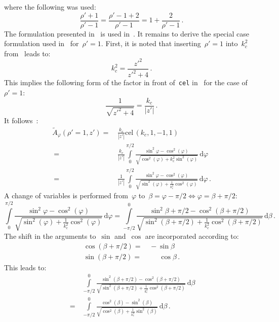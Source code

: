 where the following was used:
\begin{equation}
    \frac{\rho' + 1}{\rho' - 1}
  = \frac{\rho'-1 + 2}{\rho' - 1}
  = 1 + \frac{2}{\rho' - 1} \, .
\end{equation}
The formulation presented in~ is used in~.
It remains to derive the special case formulation used in~ for~$\rho'=1$.
First, it is noted that inserting~$\rho'=1$ into~$k_c^2$ from~ leads to:
\begin{equation}
  k_c^2 = \frac{z'^2}{z'^2 + 4} \, .
\end{equation}
This implies the following form of the factor in front of~\texttt{cel} in~
for the case of~$\rho'=1$:
\begin{equation}
  \frac{1}{\sqrt{z'^2 + 4}} = \frac{k_c}{|z'|} \, .
\end{equation}
It follows~\cite{bulirsch_3}:
\begin{align}
  \tilde{A}_\varphi(\rho'=1,z') =&\, \frac{k_c}{|z'|} \textrm{cel}\,(k_c, 1, -1, 1) \nonumber \\
  ~ =&\, \frac{k_c}{|z'|} \int\limits_0^{\pi/2} \frac{\sin^2{\varphi} - \cos^2(\varphi)}{\sqrt{\cos^2(\varphi) + k_c^2 \sin^2(\varphi)}} \,\mathrm{d}\varphi \nonumber \\
  ~ =&\,   \frac{1}{|z'|} \int\limits_0^{\pi/2} \frac{\sin^2{\varphi} - \cos^2(\varphi)}{\sqrt{\sin^2(\varphi) + \frac{1}{k_c^2} \cos^2(\varphi)}} \,\mathrm{d}\varphi \, .
\end{align}
A change of variables is performed from~$\varphi$ to~$\beta = \varphi - \pi/2 \Leftrightarrow \varphi = \beta + \pi/2$:
\begin{equation}
   \int\limits_0^{\pi/2} \frac{\sin^2{\varphi} - \cos^2(\varphi)}{\sqrt{\sin^2(\varphi) + \frac{1}{k_c^2} \cos^2(\varphi)}} \,\mathrm{d}\varphi
 = \int\limits_{-\pi/2}^{0} \frac{\sin^2{\beta + \pi/2} - \cos^2(\beta + \pi/2)}{\sqrt{\sin^2(\beta + \pi/2) + \frac{1}{k_c^2} \cos^2(\beta + \pi/2)}} \,\mathrm{d}\beta \, .
\end{equation}
The shift in the arguments to~$\sin$ and~$\cos$ are incorporated according to:
\begin{align}
  \cos(\beta + \pi/2) =&\,          -    \sin{\beta} \\
  \sin(\beta + \pi/2) =&\, \phantom{-}\, \cos{\beta} \, .
\end{align}
This leads to:
\begin{align}
 ~  &\, \int\limits_{-\pi/2}^{0} \frac{\sin^2(\beta + \pi/2) - \cos^2(\beta + \pi/2)}{\sqrt{\sin^2(\beta + \pi/2) + \frac{1}{k_c^2} \cos^2(\beta + \pi/2)}} \,\mathrm{d}\beta \nonumber \\
 ~ =&\, \int\limits_{-\pi/2}^{0} \frac{\cos^2(\beta) - \sin^2(\beta)}{\sqrt{\cos^2(\beta ) + \frac{1}{k_c^2} \sin^2(\beta)}} \,\mathrm{d}\beta \, .
\end{align}
